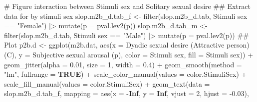 \documentclass[
  bookmarksnumbered]{article}
\newenvironment{Shaded}{\begin{snugshade}}{\end{snugshade}}
\newcommand{\AttributeTok}[1]{\textcolor[rgb]{0.80,0.80,0.80}{#1}}
\newcommand{\CommentTok}[1]{\textcolor[rgb]{0.50,0.62,0.50}{#1}}
\newcommand{\ConstantTok}[1]{\textcolor[rgb]{0.86,0.64,0.64}{\textbf{#1}}}
\newcommand{\DecValTok}[1]{\textcolor[rgb]{0.86,0.86,0.80}{#1}}
\newcommand{\DocumentationTok}[1]{\textcolor[rgb]{0.50,0.62,0.50}{#1}}
\newcommand{\FloatTok}[1]{\textcolor[rgb]{0.75,0.75,0.82}{#1}}
\newcommand{\FunctionTok}[1]{\textcolor[rgb]{0.94,0.94,0.56}{#1}}
\newcommand{\NormalTok}[1]{\textcolor[rgb]{0.80,0.80,0.80}{#1}}
\newcommand{\OtherTok}[1]{\textcolor[rgb]{0.94,0.94,0.56}{#1}}
\newcommand{\SpecialCharTok}[1]{\textcolor[rgb]{0.86,0.64,0.64}{#1}}
\newcommand{\StringTok}[1]{\textcolor[rgb]{0.80,0.58,0.58}{#1}}
\begin{document}
\begin{Shaded}
\begin{Highlighting}[]
\CommentTok{\# Figure interaction between Stimuli sex and Solitary sexual desire}
\DocumentationTok{\#\# Extract data for by stimuli sex}
\NormalTok{slop.m2b\_d.tab\_f }\OtherTok{\textless{}{-}} \FunctionTok{filter}\NormalTok{(slop.m2b\_d.tab, }\StringTok{\textasciigrave{}}\AttributeTok{Stimuli sex}\StringTok{\textasciigrave{}} \SpecialCharTok{==} \StringTok{"Female"}\NormalTok{) }\SpecialCharTok{|\textgreater{}}
  \FunctionTok{mutate}\NormalTok{(}\AttributeTok{p =} \FunctionTok{pval.lev2}\NormalTok{(p))}
\NormalTok{slop.m2b\_d.tab\_m }\OtherTok{\textless{}{-}} \FunctionTok{filter}\NormalTok{(slop.m2b\_d.tab, }\StringTok{\textasciigrave{}}\AttributeTok{Stimuli sex}\StringTok{\textasciigrave{}} \SpecialCharTok{==} \StringTok{"Male"}\NormalTok{) }\SpecialCharTok{|\textgreater{}}
  \FunctionTok{mutate}\NormalTok{(}\AttributeTok{p =} \FunctionTok{pval.lev2}\NormalTok{(p))}
\DocumentationTok{\#\# Plot}
\NormalTok{p2b.d }\OtherTok{\textless{}{-}} \FunctionTok{ggplot}\NormalTok{(m2b.dat, }\FunctionTok{aes}\NormalTok{(}\AttributeTok{x =} \StringTok{\textasciigrave{}}\AttributeTok{Dyadic sexual desire (Attractive person) (C)}\StringTok{\textasciigrave{}}\NormalTok{,}
                             \AttributeTok{y =} \StringTok{\textasciigrave{}}\AttributeTok{Subjective sexual arousal (p)}\StringTok{\textasciigrave{}}\NormalTok{,}
                             \AttributeTok{color =} \StringTok{\textasciigrave{}}\AttributeTok{Stimuli sex}\StringTok{\textasciigrave{}}\NormalTok{, }\AttributeTok{fill =} \StringTok{\textasciigrave{}}\AttributeTok{Stimuli sex}\StringTok{\textasciigrave{}}\NormalTok{)) }\SpecialCharTok{+}
  \FunctionTok{geom\_jitter}\NormalTok{(}\AttributeTok{alpha =} \FloatTok{0.01}\NormalTok{, }\AttributeTok{size =} \DecValTok{1}\NormalTok{, }\AttributeTok{width =} \FloatTok{0.4}\NormalTok{) }\SpecialCharTok{+}
  \FunctionTok{geom\_smooth}\NormalTok{(}\AttributeTok{method =} \StringTok{"lm"}\NormalTok{, }\AttributeTok{fullrange =} \ConstantTok{TRUE}\NormalTok{) }\SpecialCharTok{+}
  \FunctionTok{scale\_color\_manual}\NormalTok{(}\AttributeTok{values =}\NormalTok{ color.StimuliSex) }\SpecialCharTok{+}
  \FunctionTok{scale\_fill\_manual}\NormalTok{(}\AttributeTok{values =}\NormalTok{ color.StimuliSex) }\SpecialCharTok{+}
  \FunctionTok{geom\_text}\NormalTok{(}\AttributeTok{data =}\NormalTok{ slop.m2b\_d.tab\_f,}
            \AttributeTok{mapping =} \FunctionTok{aes}\NormalTok{(}\AttributeTok{x =} \SpecialCharTok{{-}}\ConstantTok{Inf}\NormalTok{, }\AttributeTok{y =} \ConstantTok{Inf}\NormalTok{,}
            \AttributeTok{vjust =} \DecValTok{2}\NormalTok{, }\AttributeTok{hjust =} \SpecialCharTok{{-}}\FloatTok{0.03}\NormalTok{),}

\end{Highlighting}
\end{Shaded}
\end{document}
